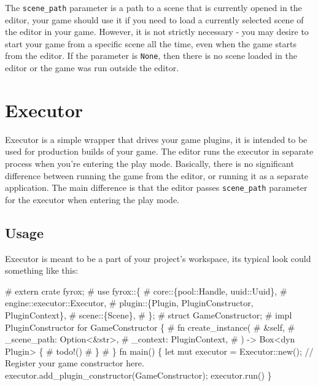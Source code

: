 \documentclass[
]{book}
\newenvironment{Shaded}{\begin{snugshade}}{\end{snugshade}}
\newcommand{\NormalTok}[1]{#1}
\theoremstyle{definition}
\theoremstyle{definition}
\theoremstyle{definition}
\theoremstyle{definition}
\theoremstyle{remark}
\begin{document}
The \texttt{scene\_path} parameter is a path to a scene that is currently opened in the editor, your game should use it if you need to load a currently selected scene of the editor in your game. However, it is not strictly necessary - you may desire to start your game from a specific scene all the time, even when the game starts from the editor. If the parameter is \texttt{None}, then there is no scene loaded in the editor or the game was run outside the editor.

\section{Executor}\label{executor}

Executor is a simple wrapper that drives your game plugins, it is intended to be used for production builds of your game. The editor runs the executor in separate process when you're entering the play mode. Basically, there is no significant difference between running the game from the editor, or running it as a separate application. The main difference is that the editor passes \texttt{scene\_path} parameter for the executor when entering the play mode.

\subsection{Usage}\label{usage-1}

Executor is meant to be a part of your project's workspace, its typical look could something like this:

\begin{Shaded}
\begin{Highlighting}[]
\NormalTok{\# extern crate fyrox;}
\NormalTok{\# use fyrox::\{}
\NormalTok{\#     core::\{pool::Handle, uuid::Uuid\},}
\NormalTok{\#     engine::executor::Executor,}
\NormalTok{\#     plugin::\{Plugin, PluginConstructor, PluginContext\},}
\NormalTok{\#     scene::\{Scene\},}
\NormalTok{\# \};}
\NormalTok{\# struct GameConstructor;}
\NormalTok{\# impl PluginConstructor for GameConstructor \{}
\NormalTok{\#     fn create\_instance(}
\NormalTok{\#         \&self,}
\NormalTok{\#         \_scene\_path: Option\textless{}\&str\textgreater{},}
\NormalTok{\#         \_context: PluginContext,}
\NormalTok{\#     ) {-}\textgreater{} Box\textless{}dyn Plugin\textgreater{} \{}
\NormalTok{\#         todo!()}
\NormalTok{\#     \}}
\NormalTok{\# \}}
\NormalTok{fn main() \{}
\NormalTok{    let mut executor = Executor::new();}
\NormalTok{    // Register your game constructor here.}
\NormalTok{    executor.add\_plugin\_constructor(GameConstructor);}
\NormalTok{    executor.run()}
\NormalTok{\}}
\end{Highlighting}
\end{Shaded}
\end{document}
